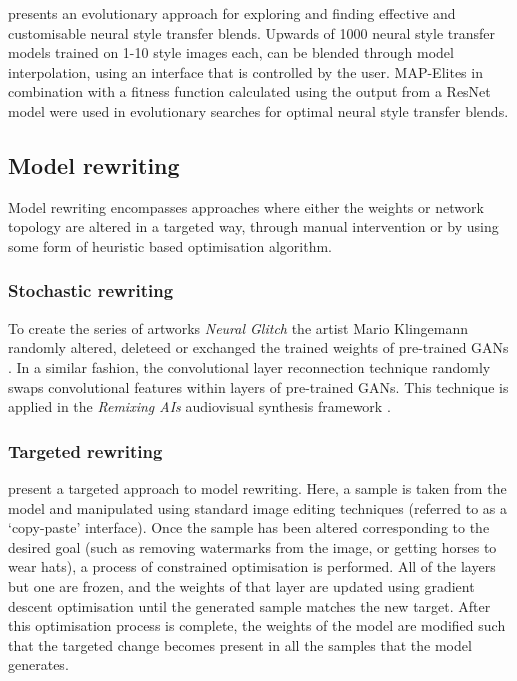 \citet{colton2021evolving} presents an evolutionary approach for exploring and finding effective and customisable neural style transfer blends. 
Upwards of 1000 neural style transfer models trained on 1-10 style images each, can be blended through model interpolation, using an interface that is controlled by the user. 
MAP-Elites \citep{mouret2015illuminating} in combination with a fitness function calculated using the output from a ResNet model \citep{he2016deep} were used in evolutionary searches for optimal neural style transfer blends. 

\subsection{Model rewriting}
\label{survey:rewriting}

Model rewriting encompasses approaches where either the weights or network topology are altered in a targeted way, through manual intervention or by using some form of heuristic based optimisation algorithm. 

\subsubsection{Stochastic rewriting} 

To create the series of artworks \textit{Neural Glitch} the artist Mario Klingemann randomly altered, deleteed or exchanged the trained weights of pre-trained GANs \citep{klingemann2018neural}. 
In a similar fashion, the convolutional layer reconnection technique \citep{ruzika2020gan} randomly swaps convolutional features within layers of pre-trained GANs. 
This technique is applied in the \textit{Remixing AIs} audiovisual synthesis framework \citep{collins2020remixing}.

\subsubsection{Targeted rewriting} 
\citet{bau2020rewriting} present a targeted approach to model rewriting. 
Here, a sample is taken from the model and manipulated using standard image editing techniques (referred to as a `copy-paste' interface). 
Once the sample has been altered corresponding to the desired goal (such as removing watermarks from the image, or getting horses to wear hats), a process of constrained optimisation is performed. 
All of the layers but one are frozen, and the weights of that layer are updated using gradient descent optimisation until the generated sample matches the new target. 
After this optimisation process is complete, the weights of the model are modified such that the targeted change becomes present in all the samples that the model generates.

